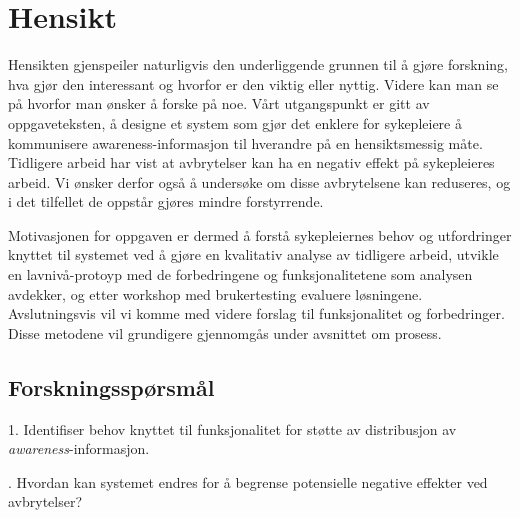 \section{Hensikt}
\label{chp: hensikt}

Hensikten gjenspeiler naturligvis den underliggende grunnen til å gjøre forskning, hva gjør den interessant og hvorfor er den viktig eller nyttig. Videre kan man se på hvorfor man ønsker å forske på noe. Vårt utgangspunkt er gitt av oppgaveteksten, å designe et system som gjør det enklere for sykepleiere å kommunisere awareness-informasjon til hverandre på en hensiktsmessig måte. Tidligere arbeid har vist at avbrytelser kan ha en negativ effekt på sykepleieres arbeid. Vi ønsker derfor også å undersøke om disse avbrytelsene kan reduseres, og i det tilfellet de oppstår gjøres mindre forstyrrende. 

\noindent
Motivasjonen for oppgaven er dermed å forstå sykepleiernes behov og utfordringer knyttet til systemet ved å gjøre en kvalitativ analyse av tidligere arbeid, utvikle en lavnivå-protoyp med de forbedringene og funksjonalitetene som analysen avdekker, og etter workshop med brukertesting evaluere løsningene. Avslutningsvis vil vi komme med videre forslag til funksjonalitet og forbedringer. Disse metodene vil grundigere gjennomgås under avsnittet om prosess. 

\subsection{Forskningsspørsmål}
1. Identifiser behov knyttet til funksjonalitet for støtte av distribusjon av \emph{awareness}-informasjon.

. Hvordan kan systemet endres for å begrense potensielle negative effekter ved avbrytelser?
